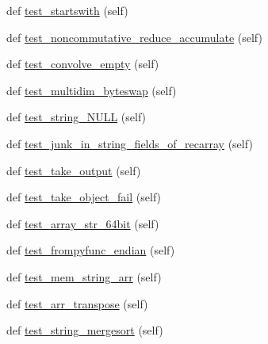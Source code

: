 \begin{DoxyCompactItemize}
\item 
def \hyperlink{classnumpy_1_1core_1_1tests_1_1test__regression_1_1TestRegression_aaeed3971f73c4960c5944dd863e867ad}{test\+\_\+startswith} (self)
\item 
def \hyperlink{classnumpy_1_1core_1_1tests_1_1test__regression_1_1TestRegression_aefe72a11bd3e22a2c12cd813caf11112}{test\+\_\+noncommutative\+\_\+reduce\+\_\+accumulate} (self)
\item 
def \hyperlink{classnumpy_1_1core_1_1tests_1_1test__regression_1_1TestRegression_a54844fa905bf81e7a7cdd1433d1a1688}{test\+\_\+convolve\+\_\+empty} (self)
\item 
def \hyperlink{classnumpy_1_1core_1_1tests_1_1test__regression_1_1TestRegression_a95f7f525df49ac6d86e33e634f32e18a}{test\+\_\+multidim\+\_\+byteswap} (self)
\item 
def \hyperlink{classnumpy_1_1core_1_1tests_1_1test__regression_1_1TestRegression_a8470219053ae6d28d590bdd40abe86ae}{test\+\_\+string\+\_\+\+N\+U\+LL} (self)
\item 
def \hyperlink{classnumpy_1_1core_1_1tests_1_1test__regression_1_1TestRegression_a51891ad52146ae3140cc291f885003cd}{test\+\_\+junk\+\_\+in\+\_\+string\+\_\+fields\+\_\+of\+\_\+recarray} (self)
\item 
def \hyperlink{classnumpy_1_1core_1_1tests_1_1test__regression_1_1TestRegression_a44c55d70ef4b2eeafdca9ed84647407d}{test\+\_\+take\+\_\+output} (self)
\item 
def \hyperlink{classnumpy_1_1core_1_1tests_1_1test__regression_1_1TestRegression_a587dec2cd638a0049c14c99b6188b898}{test\+\_\+take\+\_\+object\+\_\+fail} (self)
\item 
def \hyperlink{classnumpy_1_1core_1_1tests_1_1test__regression_1_1TestRegression_a53c2b12753e11835844715b70b05a0bb}{test\+\_\+array\+\_\+str\+\_\+64bit} (self)
\item 
def \hyperlink{classnumpy_1_1core_1_1tests_1_1test__regression_1_1TestRegression_a4631b9c2840a3b699a5d683b1cf1168f}{test\+\_\+frompyfunc\+\_\+endian} (self)
\item 
def \hyperlink{classnumpy_1_1core_1_1tests_1_1test__regression_1_1TestRegression_a20c54fe946dcbce3b997ca5ec210edbc}{test\+\_\+mem\+\_\+string\+\_\+arr} (self)
\item 
def \hyperlink{classnumpy_1_1core_1_1tests_1_1test__regression_1_1TestRegression_adc5120b9dcf763364d644e7f90f2ae02}{test\+\_\+arr\+\_\+transpose} (self)
\item 
def \hyperlink{classnumpy_1_1core_1_1tests_1_1test__regression_1_1TestRegression_ab55454dd828a5b272199252ebe8c80d8}{test\+\_\+string\+\_\+mergesort} (self)

\end{DoxyCompactItemize}
